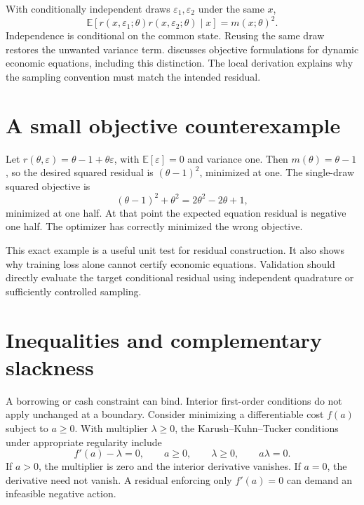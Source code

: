With conditionally independent draws $\varepsilon_1,\varepsilon_2$ under the same $x$,
\begin{equation}
 \mathbb E[r(x,\varepsilon_1;\theta)r(x,\varepsilon_2;\theta)\mid x]=m(x;\theta)^2.
\end{equation}
Independence is conditional on the common state. Reusing the same draw restores the unwanted variance term. \citet[Definitions 2.5--2.9 and Algorithm 1]{maliar2021} discusses objective formulations for dynamic economic equations, including this distinction. The local derivation explains why the sampling convention must match the intended residual.

\section{A small objective counterexample}
Let $r(\theta,\varepsilon)=\theta-1+\theta\varepsilon$, with $\mathbb E[\varepsilon]=0$ and variance one. Then $m(\theta)=\theta-1$, so the desired squared residual is $(\theta-1)^2$, minimized at one. The single-draw squared objective is
\begin{equation}
 (\theta-1)^2+\theta^2=2\theta^2-2\theta+1,
\end{equation}
minimized at one half. At that point the expected equation residual is negative one half. The optimizer has correctly minimized the wrong objective.

This exact example is a useful unit test for residual construction. It also shows why training loss alone cannot certify economic equations. Validation should directly evaluate the target conditional residual using independent quadrature or sufficiently controlled sampling.

\section{Inequalities and complementary slackness}
A borrowing or cash constraint can bind. Interior first-order conditions do not apply unchanged at a boundary. Consider minimizing a differentiable cost $f(a)$ subject to $a\geq0$. With multiplier $\lambda\geq0$, the Karush--Kuhn--Tucker conditions under appropriate regularity include
\begin{equation}
 f'(a)-\lambda=0,\qquad a\geq0,\qquad \lambda\geq0,\qquad a\lambda=0.
\end{equation}
If $a>0$, the multiplier is zero and the interior derivative vanishes. If $a=0$, the derivative need not vanish. A residual enforcing only $f'(a)=0$ can demand an infeasible negative action.

